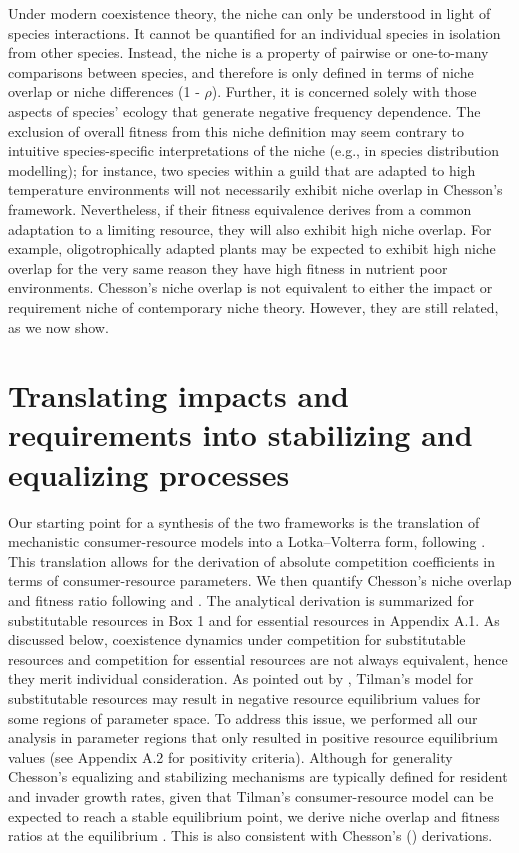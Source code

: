Under modern coexistence theory, the niche can only be understood in light of species interactions. It cannot be quantified for an individual species in isolation from other species. Instead, the niche is a property of pairwise or one-to-many comparisons between species, and therefore is only defined in terms of niche overlap or niche differences (1 - $\rho$). Further, it is concerned solely with those aspects of species' ecology that generate negative frequency dependence. The exclusion of overall fitness from this niche definition may seem contrary to intuitive species-specific interpretations of the niche (e.g., in species distribution modelling); for instance, two species within a guild that are adapted to high temperature environments will not necessarily exhibit niche overlap in Chesson's framework. Nevertheless, if their fitness equivalence derives from a common adaptation to a limiting resource, they will also exhibit high niche overlap. For example, oligotrophically adapted plants may be expected to exhibit high niche overlap for the very same reason they have high fitness in nutrient poor environments. Chesson's niche overlap is not equivalent to either the impact or requirement niche of contemporary niche theory. However, they are still related, as we now show. 
\par



\section{Translating impacts and requirements into stabilizing and equalizing processes}
Our starting point for a synthesis of the two frameworks is the translation of mechanistic consumer-resource models into a Lotka--Volterra form, following \citet{tilman1982}. This translation allows for the derivation of absolute competition coefficients in terms of consumer-resource parameters. We then quantify Chesson's niche overlap and fitness ratio following \citet{Chesson2008b} and \citet{Chesson2013ecosys}. The analytical derivation is summarized for substitutable resources in Box 1 and for essential resources in Appendix A.1. As discussed below, coexistence dynamics under competition for substitutable resources and competition for essential resources are not always equivalent, hence they merit individual consideration. As pointed out by \citet{Kleinhesselink2015}, Tilman's model for substitutable resources may result in negative resource equilibrium values for some regions of parameter space. To address this issue, we performed all our analysis in parameter regions that only resulted in positive resource equilibrium values (see Appendix A.2 for positivity criteria). Although for generality Chesson's equalizing and stabilizing mechanisms are typically defined for resident and invader growth rates, given that Tilman's consumer-resource model can be expected to reach a stable equilibrium point, we derive niche overlap and fitness ratios at the equilibrium \cite[see also][]{Kleinhesselink2015}. This is also consistent with Chesson's (\citeyear{Chesson1990}) derivations.
\par


